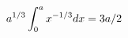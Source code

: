 \documentclass[preview]{standalone}
\begin{document}
\begin{align*}
\special{dvisvgm:raw <g id='unique000'>}a^{1/3}\int_0^a x^{-1/3}dx=3a/2\special{dvisvgm:raw </g>}
\end{align*}
\end{document}
